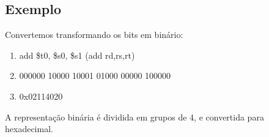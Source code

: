 \documentclass{article}
\begin{document}
\subsection{Exemplo}

Convertemos transformando os bits em binário:
\begin{enumerate}
    
    \item add \$t0, \$s0, \$s1 (add rd,rs,rt)
    \item 000000 10000 10001 01000 00000 100000
    \item 0x02114020
\end{enumerate}
A representação binária é dividida em grupos de 4, e convertida para hexadecimal.
\end{document}
